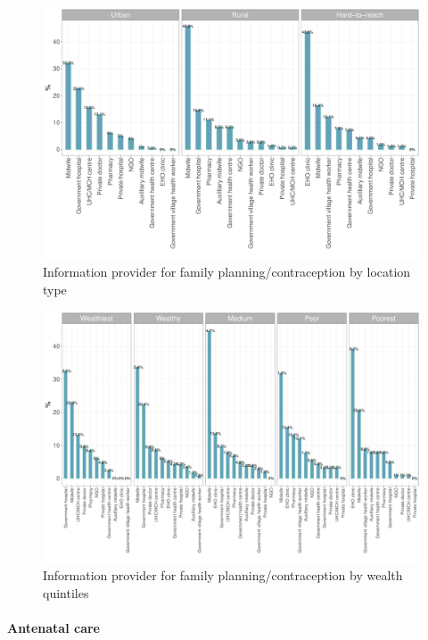 \documentclass[12pt,a4paper]{article}
\let\oldparagraph\paragraph
\renewcommand{\paragraph}[1]{\oldparagraph{#1}\mbox{}}
\begin{document}
\begin{figure}[H]

{\centering \includegraphics{kayinReport_files/figure-latex/fplan5plot-1} 

}

\caption{Information provider for family planning/contraception by location type}\label{fig:fplan5plot}
\end{figure}

\begin{figure}[H]

{\centering \includegraphics{kayinReport_files/figure-latex/fplan6plot-1} 

}

\caption{Information provider for family planning/contraception by wealth quintiles}\label{fig:fplan6plot}
\end{figure}

\hypertarget{anc}{%
\paragraph{Antenatal care}\label{anc}}
\end{document}
